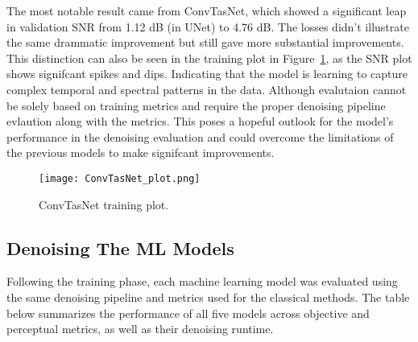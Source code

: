 The most notable result came from ConvTasNet, which showed a significant leap in validation SNR from 1.12 dB (in UNet) to 4.76 dB. The losses didn't illustrate the same drammatic improvement but still gave more substantial improvements. This distinction can also be seen in the training plot in Figure~\ref{fig:convtasnet_training_plot}, as the SNR plot shows signifcant spikes and dips. Indicating that the model is learning to capture complex temporal and spectral patterns in the data. Although evalutaion cannot be solely based on training metrics and require the proper denoising pipeline evlaution along with the metrics. This poses a hopeful outlook for the model's performance in the denoising evaluation and could overcome the limitations of the previous models to make signifcant improvements.

\begin{figure}[H]
    \centering
    \texttt{[image: ConvTasNet\_plot.png]}
    \caption{\label{fig:convtasnet_training_plot} ConvTasNet training plot.}
\end{figure}

\subsection{Denoising The ML Models}
\label{sec:denoising_ml_models}

Following the training phase, each machine learning model was evaluated using the same denoising pipeline and metrics used for the classical methods. The table below summarizes the performance of all five models across objective and perceptual metrics, as well as their denoising runtime.

